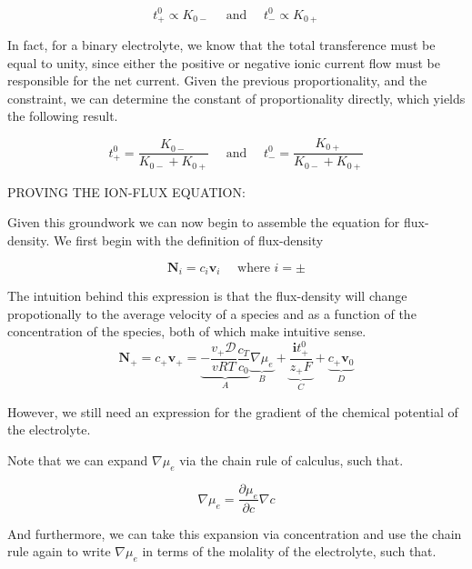 \documentclass[lettersize,journal]{IEEEtran}
\begin{document}
\begin{equation}
t_{+}^{0} \propto K_{0-} \quad \text { and } \quad t_{-}^{0} \propto K_{0+}
\end{equation}

In fact, for a binary electrolyte, we know that the total transference must be equal to unity, since either the positive or negative ionic current flow must be responsible for the net current. Given the previous proportionality, and the constraint, we can determine the constant of proportionality directly, which yields the following result.

\begin{equation}\label{transference_num_def}
t_{+}^{0}=\frac{K_{0-}}{K_{0-}+K_{0+}} \quad \text { and } \quad t_{-}^{0}=\frac{K_{0+}}{K_{0-}+K_{0+}}
\end{equation}


PROVING THE ION-FLUX EQUATION:

Given this groundwork we can now begin to assemble the equation for flux-density. We first begin with the definition of flux-density


\begin{equation}
  \textbf{N}_i = c_{i} \textbf{v}_i \quad \text{    where } i = \pm
\end{equation}

The intuition behind this expression is that the flux-density will change propotionally to the average velocity of a species and as a function of the concentration of the species, both of which make intuitive sense. \\

\begin{equation}\label{flux_density}
\mathbf{N}_{+}=c_{+} \mathbf{v}_{+}=\underbrace{-\frac{v_{+} \mathscr{D}}{v R T} \frac{c_{T}}{c_{0}}}_{A} \underbrace{\nabla \mu_{e}}_{B}+\underbrace{\frac{\mathbf{i} t_{+}^{0}}{z_{+} F}}_{C}+\underbrace{c_{+} \mathbf{v}_{0}}_{D}
\end{equation}


However, we still need an expression for the gradient of the chemical potential of the electrolyte.

Note that we can expand $\nabla \mu_e$ via the chain rule of calculus, such that.


\begin{equation}
  \nabla \mu_e = \frac{\partial{\mu_e}}{\partial{c}} \nabla c
\end{equation}

And furthermore, we can take this expansion via concentration and use the chain rule again to write $\nabla \mu_e$ in terms of the molality of the electrolyte, such that.
\end{document}

